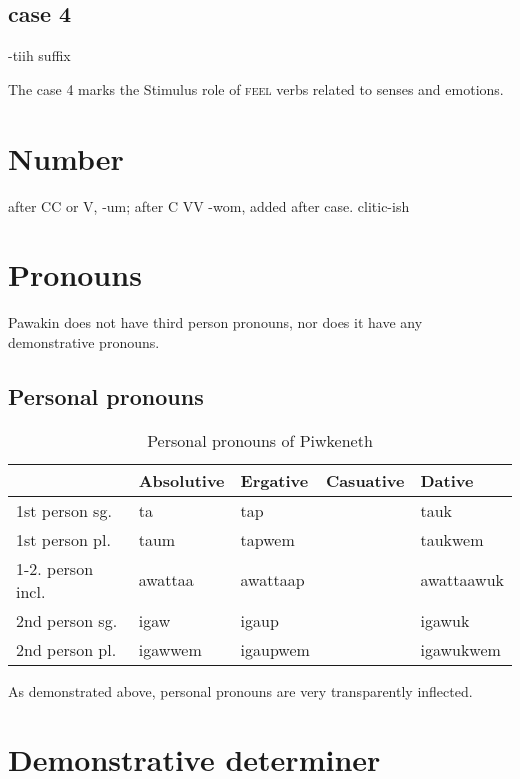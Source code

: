 \documentclass[smallroyalvopaper,9pt]{memoir} %
\newcommand{\lang}{Piwkeneth}
\newcommand{\langeng}{Pawakin}
\begin{document}
\subsection{case 4}

-tiih suffix

The case 4 marks the Stimulus role of \textsc{feel} verbs related to senses and emotions.

\section{Number}

after CC or V, -um; after C VV -wom, added after case. clitic-ish

\section{Pronouns}

\langeng{} does not have third person pronouns, nor does it have any demonstrative pronouns. 

\subsection{Personal pronouns}

\begin{table}[ht]
    \centering
    \begin{tabular}{lllll}
        \toprule
                             & Absolutive & Ergative & Casuative & Dative \\
        \midrule
        1st person sg.       & ta         & tap      &   & tauk \\
        1st person pl.       & taum       & tapwem   &   & taukwem \\
        1-2. person incl.    & awattaa    & awattaap &   & awattaawuk \\
        2nd person sg.       & igaw       & igaup    &   & igawuk \\
        2nd person pl.       & igawwem    & igaupwem &   & igawukwem \\
        \bottomrule
    \end{tabular}
    \caption{Personal pronouns of \lang}
\end{table}

As demonstrated above, personal pronouns are very transparently inflected. 

\section{Demonstrative determiner}
\end{document}
